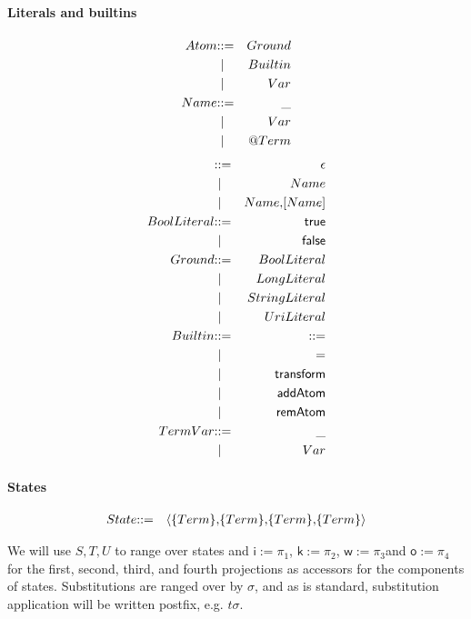 \paragraph{Literals and builtins}
\begin{eqnarray*}
  Atom & \mathbin{\mathbf{::=}} & Ground \\
  & \;\mathbin{\mathbf\mid} \; & Builtin \\
  & \;\mathbin{\mathbf\mid} \; & Var \\
  Name & \mathbin{\mathbf{::=}} & \mathsf{\_} \\
  & \;\mathbin{\mathbf\mid} \; & Var \\
  & \;\mathbin{\mathbf\mid} \; & \mathsf{@} Term
\end{eqnarray*}
\begin{eqnarray*}  
  [Name] & \bc & \epsilon \\
  & \;\bm \; & Name \\
  & \;\bm \; & Name \mathsf{,} [Name] \\
  BoolLiteral & \bc & \mathsf{true} \\
 & \;\bm \; & \mathsf{false} \\
  Ground & \bc & BoolLiteral \\
  & \;\bm \; & LongLiteral \\
  & \;\bm \; & StringLiteral \\
  & \;\bm \; & UriLiteral \\
  Builtin & \bc & \mathsf{\bc} \\
  & \;\bm \; & \mathsf{=} \\
  & \;\bm \; & \mathsf{transform} \\
  & \;\bm \; & \mathsf{addAtom} \\
  & \;\bm \; & \mathsf{remAtom} \\
  TermVar & \bc & \mathsf{\_} \\
  & \;\bm \; & Var \\
\end{eqnarray*}

\paragraph{States}
\begin{eqnarray*}
  State & \mathbin{\mathbf{::=}} & \langle \mathsf{\{}Term\mathsf{\}} \mathsf{,} \mathsf{\{}Term\mathsf{\}} \mathsf{,} \mathsf{\{}Term\mathsf{\}} \mathsf{,} \mathsf{\{}Term\mathsf{\}} \rangle
\end{eqnarray*}

We will use $S, T, U$ to range over states and $\mathsf{i} := \pi_{1}$, $\mathsf{k} := \pi_{2}$, $\mathsf{w} := \pi_{3}$and $\mathsf{o} := \pi_{4}$ for the first, second, third, and fourth projections as accessors for the components of states. Substitutions are ranged over by $\sigma$, and as is standard, substitution application will be written postfix, e.g. $t\sigma$.

